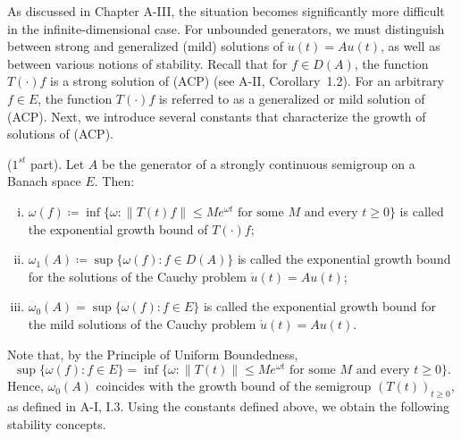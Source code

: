 \medskip
\noindent
As discussed in Chapter A-III, the situation becomes significantly more difficult in the infinite-dimensional case. For unbounded generators, we must distinguish between strong and generalized (mild) solutions of $\dot{u}(t) = Au(t)$, as well as between various notions of stability. 
Recall that for $f \in D(A)$, the function $T(\cdot)f$ is a strong solution of (ACP) (see A-II, Corollary~1.2). 
For an arbitrary $f \in E$, the function $T(\cdot)f$ is referred to as a generalized or mild solution of (ACP). 
Next, we introduce several constants that characterize the growth of solutions of (ACP).

\begin{definition} ($1^{st}$ part).\label{def:a4-1.1}
Let $A$ be the generator of a strongly continuous semigroup on a Banach space $E$. 
Then:
\begin{enumerate}[(i)]
\item $\omega(f) \coloneqq \inf\{\omega : \|T(t)f\| \leq Me^{\omega t} \text{ for some } M \text{ and every } t \geq 0\}$ is called the exponential growth bound of $T(\cdot)f$;
\item $\omega_{1}(A) \coloneqq \sup\{\omega(f) : f \in D(A)\}$ is called the exponential growth bound for the solutions of the Cauchy problem $\dot{u}(t) = Au(t)$;
\item $\omega_0(A) = \sup\{\omega(f) : f \in E\}$ is called the exponential growth bound for the mild solutions of the Cauchy problem $\dot{u}(t) = Au(t)$.
\end{enumerate}
\end{definition}
Note that, by the Principle of Uniform Boundedness, 
\[
\sup\{\omega(f) : f \in E\} = \inf\{\omega : \|T(t)\| \leq Me^{\omega t} \text{ for some } M \text{ and every } t \geq 0\}.
\]
Hence, $\omega_0(A)$ coincides with the growth bound of the semigroup $(T(t))_{t \geq 0}$, as defined in A-I, I.3. 
Using the constants defined above, we obtain the following stability concepts.

